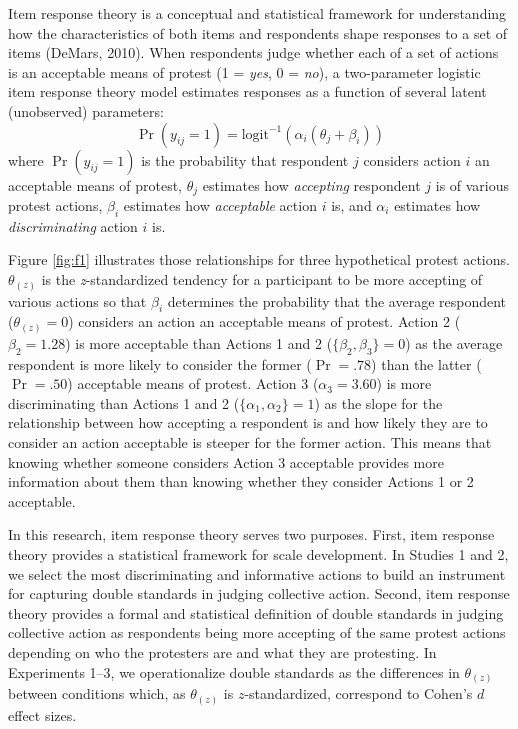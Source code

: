 \documentclass[12pt, letterpaper]{article}
\begin{document}
Item response theory is a conceptual and statistical framework for
understanding how the characteristics of both items and respondents
shape responses to a set of items (DeMars, 2010). When respondents judge
whether each of a set of actions is an acceptable means of protest (1 =
\emph{yes}, 0 = \emph{no}), a two-parameter logistic item response
theory model estimates responses as a function of several latent
(unobserved) parameters:
\[ \Pr ( y_\textit{ij} = 1 ) = \text{logit}^{-1} ( \alpha_i ( \theta_j + \beta_i ) ) \]
where \(\Pr ( y_\textit{ij} = 1 )\) is the probability that respondent
\(j\) considers action \(i\) an acceptable means of protest,
\(\theta_j\) estimates how \emph{accepting} respondent \(j\) is of
various protest actions, \(\beta_i\) estimates how \emph{acceptable}
action \(i\) is, and \(\alpha_i\) estimates how \emph{discriminating}
action \(i\) is.

Figure \ref{fig:f1} illustrates those relationships for three
hypothetical protest actions. \(\theta_{(z)}\) is the
\emph{z}-standardized tendency for a participant to be more accepting of
various actions so that \(\beta_i\) determines the probability that the
average respondent (\(\theta_{(z)} = 0\)) considers an action an
acceptable means of protest. Action 2 (\(\beta_2 = 1.28\)) is more
acceptable than Actions 1 and 2 (\(\{ \beta_2, \beta_3 \} = 0\)) as the
average respondent is more likely to consider the former (\(\Pr = .78\))
than the latter (\(\Pr = .50\)) acceptable means of protest. Action 3
(\(\alpha_3 = 3.60\)) is more discriminating than Actions 1 and 2
(\(\{ \alpha_1, \alpha_2 \} = 1\)) as the slope for the relationship
between how accepting a respondent is and how likely they are to
consider an action acceptable is steeper for the former action. This
means that knowing whether someone considers Action 3 acceptable
provides more information about them than knowing whether they consider
Actions 1 or 2 acceptable.

In this research, item response theory serves two purposes. First, item
response theory provides a statistical framework for scale development.
In Studies 1 and 2, we select the most discriminating and informative
actions to build an instrument for capturing double standards in judging
collective action. Second, item response theory provides a formal and
statistical definition of double standards in judging collective action
as respondents being more accepting of the same protest actions
depending on who the protesters are and what they are protesting. In
Experiments 1--3, we operationalize double standards as the differences
in \(\theta_{(z)}\) between conditions which, as \(\theta_{(z)}\) is
\(z\)-standardized, correspond to Cohen's \(d\) effect sizes.
\end{document}
